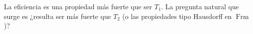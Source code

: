 \documentclass[11pt]{amsart}
\DeclareMathOperator{\tp}{tp}
\DeclareMathOperator{\Frm}{Frm}
\theoremstyle{plain}
\newtheorem{prop}[thm]{Proposición}
\theoremstyle{definition}
\begin{document}
La eficiencia es una propiedad más fuerte que ser $T_1$. La pregunta natural que surge es ¿resulta ser más fuerte que $T_2$ (o las propiedades tipo Hausdorff en $\Frm$)?






%

    
\end{document}
